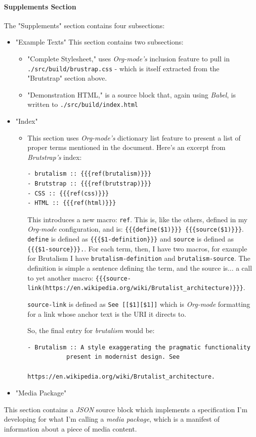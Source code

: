 \documentclass[11pt]{article}
\begin{document}
\paragraph*{Supplements Section}
\label{sec:orgf59bde1}
The "Supplements" section contains four subsections:
\begin{itemize}
\item "Example Texts"
This section contains two subsections:
\begin{itemize}
\item "Complete Stylesheet," uses \emph{Org-mode's} inclusion feature to pull
in \texttt{./src/build/brustrap.css} - which is itself extracted from the
"Brutstrap" section above.
\item "Demonstration HTML," is a source block that, again using \emph{Babel},
is written to \texttt{./src/build/index.html}
\end{itemize}
\item "Index"
\begin{itemize}
\item This section uses \emph{Org-mode's} dictionary list feature to present
a list of proper terms mentioned in the document. Here's an
excerpt from \emph{Brutstrap's} index:
\begin{verbatim}
- brutalism :: {{{ref(brutalism)}}}
- Brutstrap :: {{{ref(brutstrap)}}}
- CSS :: {{{ref(css)}}}
- HTML :: {{{ref(html)}}}
\end{verbatim}
This introduces a new macro: \texttt{ref}. This is, like the others,
defined in my \emph{Org-mode} configuration, and is: \texttt{\{\{\{define(\$1)\}\}\}
    \{\{\{source(\$1)\}\}\}}. \texttt{define} is defined as \texttt{\{\{\{\$1-definition\}\}\}}
and \texttt{source} is defined as \texttt{\{\{\{\$1-source\}\}\}.}. For each term, then,
I have two macros, for example for Brutalism I have
\texttt{brutalism-definition} and \texttt{brutalism-source}. The definition is
simple a sentence defining the term, and the source is... a call
to yet another macro:
\texttt{\{\{\{source-link(https://en.wikipedia.org/wiki/Brutalist\_architecture)\}\}\}}.

\texttt{source-link} is defined as \texttt{See [[\$1][\$1]]} which is \emph{Org-mode}
formatting for a link whose anchor text is the URI it directs to.

So, the final entry for \emph{brutalism} would be:
\begin{verbatim}
- Brutalism :: A style exaggerating the pragmatic functionality
	       present in modernist design. See
	       https://en.wikipedia.org/wiki/Brutalist_architecture.
\end{verbatim}
\end{itemize}
\item "Media Package"
\end{itemize}
This section contains a \emph{JSON} source block which implements a
specification I'm developing for what I'm calling a \emph{media package},
which is a manifest of information about a piece of media content.
\end{document}
